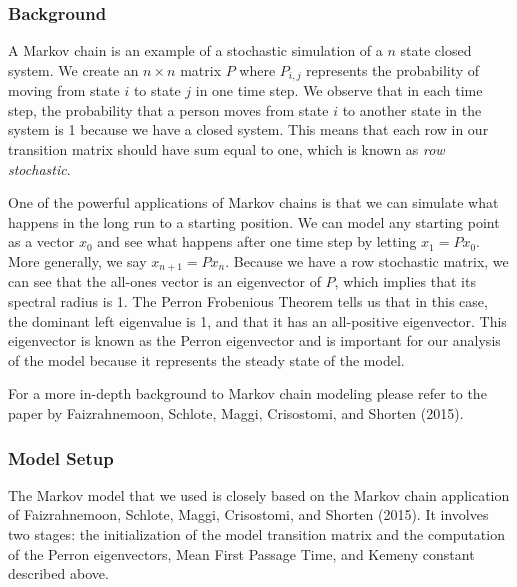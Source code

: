 \documentclass[twoside,twocolumn]{article}
\begin{document}
\subsubsection{Background}

A Markov chain is an example of a stochastic simulation of a $n$ state closed system.
We create an $n\times n$ matrix $P$ where $P_{i,j}$ represents the probability of moving from state $i$ to state $j$ in one time step.
We observe that in each time step, the probability that a person moves from state $i$ to another state in the system is 1 because we have a closed system.
This means that each row in our transition matrix should have sum equal to one, which is known as {\em row stochastic}.

One of the powerful applications of Markov chains is that we can simulate what happens in the long run to a starting position.
We can model any starting point as a vector $x_0$ and see what happens after one time step by letting $x_1 = P x_0$.
More generally, we say $x_{n + 1} = P x_n$.
Because we have a row stochastic matrix, we can see that the all-ones vector is an eigenvector of $P$, which implies that its spectral radius is 1.
The Perron Frobenious Theorem tells us that in this case, the dominant left eigenvalue is 1, and that it has an all-positive eigenvector.
This eigenvector is known as the Perron eigenvector and is important for our analysis of the model because it represents the steady state of the model.

For a more in-depth background to Markov chain modeling please refer to the paper by Faizrahnemoon, Schlote, Maggi, Crisostomi, and Shorten (2015).

\subsubsection{Model Setup}

The Markov model that we used is closely based on the Markov chain application of Faizrahnemoon, Schlote, Maggi, Crisostomi, and Shorten (2015).
It involves two stages: the initialization of the model transition matrix and the computation of the Perron eigenvectors, Mean First Passage Time, and Kemeny constant described above. %



\end{document}
